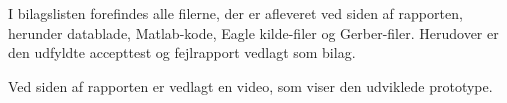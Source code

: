 I bilagslisten forefindes alle filerne, der er afleveret ved siden af rapporten, herunder datablade, Matlab-kode, Eagle kilde-filer og Gerber-filer. Herudover er den udfyldte accepttest og fejlrapport vedlagt som bilag.

Ved siden af rapporten er vedlagt en video, som viser den udviklede prototype.

